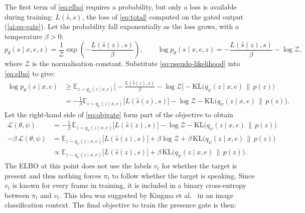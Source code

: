 The first term of \eqref{eq:elbo} requires a probability, but only a loss is available during training: $L(\hat{s}, s)$, the loss of \eqref{eq:total} computed on the gated output (\ref{ai:eq-gate}). Let the probability fall exponentially as the loss grows, with a temperature $\beta > 0$:
\begin{equation}
  p_\theta(s \mid x, e, z) = \frac{1}{\mathcal{Z}}
  \exp\!\left(-\frac{L(\hat{s}(z), s)}{\beta}\right),
  \qquad
  \log p_\theta(s \mid x, e, z) = -\frac{L(\hat{s}(z), s)}{\beta} -  \log \mathcal{Z},
  \label{eq:pseudo-likelihood}
  \end{equation}
where $\mathcal{Z}$ is the normalisation constant. Substitute \eqref{eq:pseudo-likelihood} into \eqref{eq:elbo} to give:
\begin{equation}
  \begin{aligned}
  \log p_\theta(s \mid x, e) &\ge \mathbb{E}_{z \sim q_\psi(z \mid x, e)}\big[-\frac{L(\hat{s}(z), s)}{\beta} - \log \mathcal{Z}\big] - \mathrm{KL}\big(q_\psi(z \mid x, e) \,\|\, p(z)\big) \\
  &= -\frac{1}{\beta} \mathbb{E}_{z \sim q_\psi(z \mid x, e)}\big[L(\hat{s}(z), s)\big] - \log \mathcal{Z} - \mathrm{KL}\big(q_\psi(z \mid x, e) \,\|\, p(z)\big).
  \end{aligned}
  \label{eq:objgate}
\end{equation}
Let the right-hand side of \eqref{eq:objgate} form part of the objective to obtain 
\begin{equation}
\begin{aligned}
  \mathcal{L}(\theta, \psi) &= -\frac{1}{\beta}\,\mathbb{E}_{z \sim q_\psi(z \mid x,e)}\big[L(\hat s(z), s)\big] - \log \mathcal{Z} - \mathrm{KL}\big(q_\psi(z \mid x, e)\,\|\,p(z)\big) \\
  -\beta\,\mathcal{L}(\theta, \psi) &= \mathbb{E}_{z \sim q_\psi(z \mid x,e)}\big[L(\hat s(z), s)\big] + \beta\log \mathcal{Z} + \beta\,\mathrm{KL}\big(q_\psi(z \mid x, e)\,\|\,p(z)\big) \\
  &\propto \mathbb{E}_{z \sim q_\psi(z \mid x,e)}\big[L(\hat s(z), s)\big] + \beta\,\mathrm{KL}\big(q_\psi(z \mid x, e)\,\|\,p(z)\big).
\end{aligned}
\label{eq:gaussian}
\end{equation}
The ELBO at this point does not use the labels $v_t$ for whether the target is present and thus nothing forces $\pi_t$ to follow whether the target is speaking. Since $v_t$ is known for every frame in training, it is included in a binary cross-entropy between $\pi_t$ and $v_t$. This idea was suggested by Kingma et al.\ \cite{kingma2014semisupervised} in an image classification context. The final objective to train the presence gate is then:
